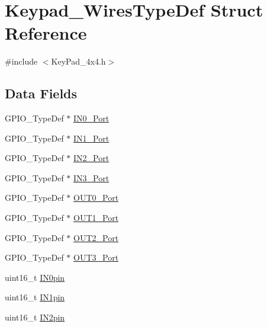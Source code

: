 \hypertarget{struct_keypad___wires_type_def}{}\section{Keypad\+\_\+\+Wires\+Type\+Def Struct Reference}
\label{struct_keypad___wires_type_def}


{\ttfamily \#include $<$Key\+Pad\+\_\+4x4.\+h$>$}

\subsection*{Data Fields}
\begin{DoxyCompactItemize}
\item 
G\+P\+I\+O\+\_\+\+Type\+Def $\ast$ \hyperlink{struct_keypad___wires_type_def_a47955289b19390cde1cbc4c77f042369}{I\+N0\+\_\+\+Port}
\item 
G\+P\+I\+O\+\_\+\+Type\+Def $\ast$ \hyperlink{struct_keypad___wires_type_def_acaa68d159d45a332a4932cd1b169d2ea}{I\+N1\+\_\+\+Port}
\item 
G\+P\+I\+O\+\_\+\+Type\+Def $\ast$ \hyperlink{struct_keypad___wires_type_def_a29bcacbed0e3a0434a118a920050c682}{I\+N2\+\_\+\+Port}
\item 
G\+P\+I\+O\+\_\+\+Type\+Def $\ast$ \hyperlink{struct_keypad___wires_type_def_a1c91503556cf87dd73d1372c64271ebc}{I\+N3\+\_\+\+Port}
\item 
G\+P\+I\+O\+\_\+\+Type\+Def $\ast$ \hyperlink{struct_keypad___wires_type_def_a10de1d8c79b463b7fa695d5df589c427}{O\+U\+T0\+\_\+\+Port}
\item 
G\+P\+I\+O\+\_\+\+Type\+Def $\ast$ \hyperlink{struct_keypad___wires_type_def_a5e0930dd209c2c8f460b318a19e1396f}{O\+U\+T1\+\_\+\+Port}
\item 
G\+P\+I\+O\+\_\+\+Type\+Def $\ast$ \hyperlink{struct_keypad___wires_type_def_aa0c12d07fe7f540e10d5d31b268e9946}{O\+U\+T2\+\_\+\+Port}
\item 
G\+P\+I\+O\+\_\+\+Type\+Def $\ast$ \hyperlink{struct_keypad___wires_type_def_a5032c6a39064da097f66706a20bed691}{O\+U\+T3\+\_\+\+Port}
\item 
uint16\+\_\+t \hyperlink{struct_keypad___wires_type_def_a1982da4b510d015cde3d54a120d32461}{I\+N0pin}
\item 
uint16\+\_\+t \hyperlink{struct_keypad___wires_type_def_ad3d88b65475a470373eff3b7960853b8}{I\+N1pin}
\item 
uint16\+\_\+t \hyperlink{struct_keypad___wires_type_def_a5091f76517c45ce696eac83b97dc9e44}{I\+N2pin}

\end{DoxyCompactItemize}
